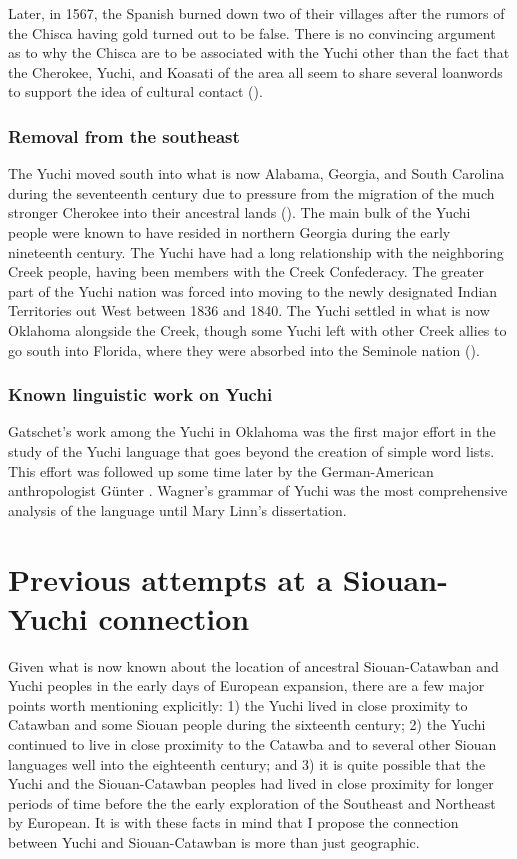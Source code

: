 \documentclass[output=paper]{LSP/langsci}
\begin{document}
Later, in 1567, the Spanish burned down two of their villages after the rumors of the Chisca having gold turned out to be false. There is no convincing argument as to why the Chisca are to be associated with the Yuchi other than the fact that the Cherokee, Yuchi, and Koasati of the area all seem to share several loanwords to support the idea of cultural contact (\citet{BookerEtAl1992}).

\subsubsection{Removal from the southeast} 

The Yuchi moved south into what is now Alabama, Georgia, and South Carolina during the seventeenth century due to pressure from the migration of the much stronger Cherokee into their ancestral lands (\citealt{Jackson2012}). The main bulk of the Yuchi people were known to have resided in northern Georgia during the early nineteenth century. The Yuchi have had a long relationship with the neighboring Creek people, having been members with the Creek Confederacy. The greater part of the Yuchi nation was forced into moving to the newly designated Indian Territories out West between 1836 and 1840. The Yuchi settled in what is now Oklahoma alongside the Creek, though some Yuchi left with other Creek allies to go south into Florida, where they were absorbed into the Seminole nation (\citealt{Mithun1999}).

\subsubsection{Known linguistic work on Yuchi} 

Gatschet's \citeyear{Gatschet1885} work among the Yuchi in Oklahoma was the first major effort in the study of the Yuchi language that goes beyond the creation of simple word lists. This effort was followed up some time later by the German-American anthropologist G\"unter \citet{Wagner1934}. Wagner's  grammar of Yuchi was the most comprehensive analysis of the language until Mary Linn's \citeyear{Linn2000} dissertation.

\section{Previous attempts at a Siouan-Yuchi connection}\label{sec:kasak:3}

Given what is now known about the location of ancestral Siouan-Catawban and Yuchi peoples in the early days of European expansion, there are a few major points worth mentioning explicitly: 1) the Yuchi lived in close proximity to Catawban and some Siouan people during the sixteenth century; 2) the Yuchi continued to live in close proximity to the Catawba and to several other Siouan languages well into the eighteenth century; and 3) it is quite possible that the Yuchi and the Siouan-Catawban peoples had lived in close proximity for longer periods of time before the the early exploration of the Southeast and Northeast by European. It is with these facts in mind that I propose the connection between Yuchi and Siouan-Catawban is more than just geographic.
\end{document}
